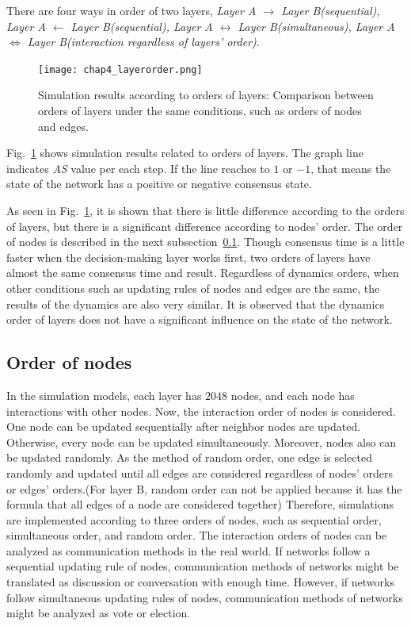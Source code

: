 There are four ways in order of two layers, \textit{Layer A $\to$ Layer B(sequential), Layer A $\leftarrow$ Layer B(sequential), Layer A $\leftrightarrow$ Layer B(simultaneous), Layer A $\Leftrightarrow$ Layer B(interaction regardless of layers' order)}. 

\begin{figure}[!htb]
	\centering
	\texttt{[image: chap4\_layerorder.png]}
	\caption{Simulation results according to orders of layers: Comparison between orders of layers under the same conditions, such as orders of nodes and edges.}
	\label{chap4_layerorder}
\end{figure}

Fig.~\ref{chap4_layerorder} shows simulation results related to orders of layers. The graph line indicates \textit{AS} value per each step. If the line reaches to $1$ or $-1$, that means the state of the network has a positive or negative consensus state.

As seen in Fig.~\ref{chap4_layerorder}, it is shown that there is little difference according to the orders of layers, but there is a significant difference according to nodes' order. The order of nodes is described in the next subsection~\ref{order of node}. Though consensus time is a little faster when the decision-making layer works first, two orders of layers have almost the same consensus time and result. Regardless of dynamics orders, when other conditions such as updating rules of nodes and edges are the same, the results of the dynamics are also very similar. It is observed that the dynamics order of layers does not have a significant influence on the state of the network. \\

\subsection{Order of nodes}
\label{order of node}
In the simulation models, each layer has $2048$ nodes, and each node has interactions with other nodes. Now, the interaction order of nodes is considered. One node can be updated sequentially after neighbor nodes are updated. Otherwise, every node can be updated simultaneously. Moreover, nodes also can be updated randomly. As the method of random order, one edge is selected randomly and updated until all edges are considered regardless of nodes' orders or edges' orders.(For layer B, random order can not be applied because it has the formula that all edges of a node are considered together) Therefore, simulations are implemented according to three orders of nodes, such as sequential order, simultaneous order, and random order. The interaction orders of nodes can be analyzed as communication methods in the real world. If networks follow a sequential updating rule of nodes, communication methods of networks might be translated as discussion or conversation with enough time. However, if networks follow simultaneous updating rules of nodes, communication methods of networks might be analyzed as vote or election.

